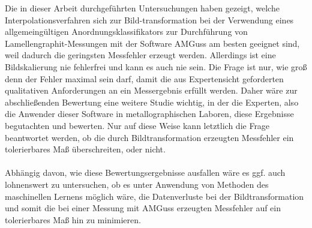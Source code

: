 \documentclass[
fontsize=10pt, 
listof = totoc,
parskip = half	
]{report}
\begin{document}
Die in dieser Arbeit durchgeführten Untersuchungen haben gezeigt, welche Interpolationsverfahren sich zur Bild-transformation bei der Verwendung eines allgemeingültigen Anordnungsklassifikators zur Durchführung von Lamellengraphit-Messungen mit der Software AMGuss am besten geeignet sind, weil dadurch die geringsten Messfehler erzeugt werden. Allerdings ist eine Bildskalierung nie fehlerfrei und kann es auch nie sein. Die Frage ist nur, wie groß denn der Fehler maximal sein darf, damit die aus Expertensicht geforderten qualitativen Anforderungen an ein Messergebnis erfüllt werden. Daher wäre zur abschließenden Bewertung eine weitere Studie wichtig, in der die Experten, also die Anwender dieser Software in metallographischen Laboren, diese Ergebnisse begutachten und bewerten. Nur auf diese Weise kann letztlich die Frage beantwortet werden, ob die durch Bildtransformation erzeugten Messfehler ein tolerierbares Maß überschreiten, oder nicht. 
\\\\
\noindent Abhängig davon, wie diese Bewertungsergebnisse ausfallen wäre es ggf. auch lohnenswert zu untersuchen, ob es unter Anwendung von Methoden des maschinellen Lernens möglich wäre, die Datenverluste bei der Bildtransformation und somit die bei einer Messung mit AMGuss erzeugten Messfehler auf ein tolerierbares Maß hin zu minimieren. 



\end{document}
